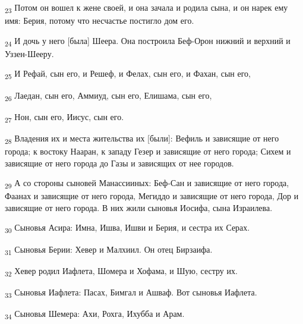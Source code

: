 \begin{tcolorbox}
\textsubscript{23} Потом он вошел к жене своей, и она зачала и родила сына, и он нарек ему имя: Берия, потому что несчастье постигло дом его.
\end{tcolorbox}
\begin{tcolorbox}
\textsubscript{24} И дочь у него [была] Шеера. Она построила Беф-Орон нижний и верхний и Уззен-Шееру.
\end{tcolorbox}
\begin{tcolorbox}
\textsubscript{25} И Рефай, сын его, и Решеф, и Фелах, сын его, и Фахан, сын его,
\end{tcolorbox}
\begin{tcolorbox}
\textsubscript{26} Лаедан, сын его, Аммиуд, сын его, Елишама, сын его,
\end{tcolorbox}
\begin{tcolorbox}
\textsubscript{27} Нон, сын его, Иисус, сын его.
\end{tcolorbox}
\begin{tcolorbox}
\textsubscript{28} Владения их и места жительства их [были]: Вефиль и зависящие от него города; к востоку Нааран, к западу Гезер и зависящие от него города; Сихем и зависящие от него города до Газы и зависящих от нее городов.
\end{tcolorbox}
\begin{tcolorbox}
\textsubscript{29} А со стороны сыновей Манассииных: Беф-Сан и зависящие от него города, Фаанах и зависящие от него города, Мегиддо и зависящие от него города, Дор и зависящие от него города. В них жили сыновья Иосифа, сына Израилева.
\end{tcolorbox}
\begin{tcolorbox}
\textsubscript{30} Сыновья Асира: Имна, Ишва, Ишви и Берия, и сестра их Серах.
\end{tcolorbox}
\begin{tcolorbox}
\textsubscript{31} Сыновья Берии: Хевер и Малхиил. Он отец Бирзаифа.
\end{tcolorbox}
\begin{tcolorbox}
\textsubscript{32} Хевер родил Иафлета, Шомера и Хофама, и Шую, сестру их.
\end{tcolorbox}
\begin{tcolorbox}
\textsubscript{33} Сыновья Иафлета: Пасах, Бимгал и Ашваф. Вот сыновья Иафлета.
\end{tcolorbox}
\begin{tcolorbox}
\textsubscript{34} Сыновья Шемера: Ахи, Рохга, Ихубба и Арам.
\end{tcolorbox}
